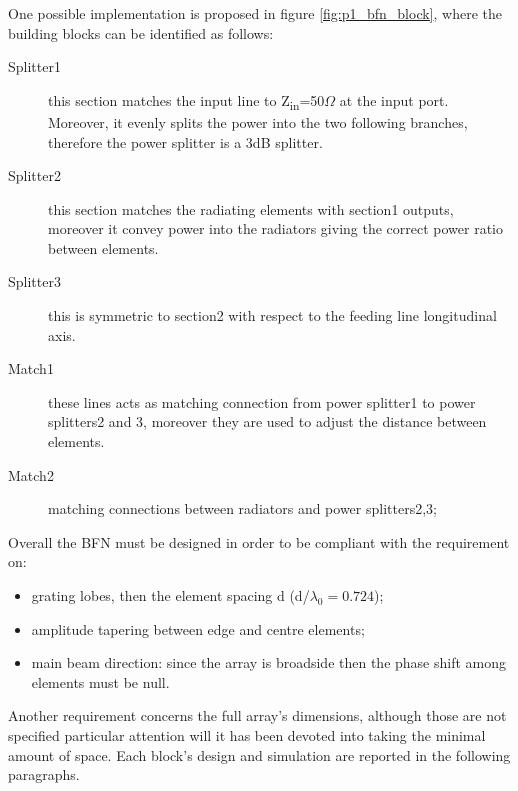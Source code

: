 One possible implementation is proposed in figure \ref{fig:p1_bfn_block}, where the building blocks can be identified as follows: 
\begin{description}
	\item [Splitter1] this section matches the input line to Z\textsubscript{in}=50$\Omega$ at the input port. Moreover, it evenly splits the power into the two following branches, therefore the power splitter is a 3dB splitter. 
	\item [Splitter2] this section matches the radiating elements with section1 outputs, moreover it convey power into the radiators giving the correct power ratio between elements.
	\item [Splitter3] this is symmetric to section2 with respect to the feeding line longitudinal axis. 
	\item [Match1] these lines acts as matching connection from power splitter1 to power splitters2 and 3, moreover they are used to adjust the distance between elements.
	\item [Match2] matching connections between radiators and power splitters2,3;
\end{description}
Overall the BFN must be designed in order to be compliant with the requirement on:
\begin{itemize}
	\item grating lobes, then the element spacing d (d/$\lambda_0=0.724$);
	\item amplitude tapering between edge and centre elements;
	\item main beam direction: since the array is broadside then the phase shift among elements must be null.
\end{itemize}
Another requirement concerns the full array's dimensions, although those are not specified particular attention will it has been devoted into taking the minimal amount of space.
Each block's design and simulation are reported in the following paragraphs.

